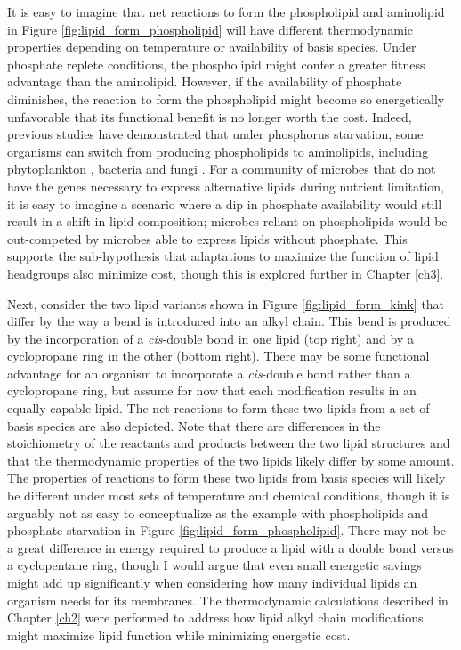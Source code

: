 It is easy to imagine that net reactions to form the phospholipid and aminolipid in Figure \ref{fig:lipid_form_phospholipid} will have different thermodynamic properties depending on temperature or availability of basis species. Under phosphate replete conditions, the phospholipid might confer a greater fitness advantage than the aminolipid. However, if the availability of phosphate diminishes, the reaction to form the phospholipid might become so energetically unfavorable that its functional benefit is no longer worth the cost. Indeed, previous studies have demonstrated that under phosphorus starvation, some organisms can switch from producing phospholipids to aminolipids, including phytoplankton \citep{van2009phytoplankton, martin2011phosphorus}, bacteria \citep{minnikin1974replacement, benning1995accumulation} and fungi \citep{riekhof2014phosphate}. For a community of microbes that do not have the genes necessary to express alternative lipids during nutrient limitation, it is easy to imagine a scenario where a dip in phosphate availability would still result in a shift in lipid composition; microbes reliant on phospholipids would be out-competed by microbes able to express lipids without phosphate. This supports the sub-hypothesis that adaptations to maximize the function of lipid headgroups also minimize cost, though this is explored further in Chapter \ref{ch3}.

Next, consider the two lipid variants shown in Figure \ref{fig:lipid_form_kink} that differ by the way a bend is introduced into an alkyl chain. This bend is produced by the incorporation of a \textit{cis}-double bond in one lipid (top right) and by a cyclopropane ring in the other (bottom right). There may be some functional advantage for an organism to incorporate a \textit{cis}-double bond rather than a cyclopropane ring, but assume for now that each modification results in an equally-capable lipid. The net reactions to form these two lipids from a set of basis species are also depicted. Note that there are differences in the stoichiometry of the reactants and products between the two lipid structures and that the thermodynamic properties of the two lipids likely differ by some amount. The properties of reactions to form these two lipids from basis species will likely be different under most sets of temperature and chemical conditions, though it is arguably not as easy to conceptualize as the example with phospholipids and phosphate starvation in Figure \ref{fig:lipid_form_phospholipid}. There may not be a great difference in energy required to produce a lipid with a double bond versus a cyclopentane ring, though I would argue that even small energetic savings might add up significantly when considering how many individual lipids an organism needs for its membranes. The thermodynamic calculations described in Chapter \ref{ch2} were performed to address how lipid alkyl chain modifications might maximize lipid function while minimizing energetic cost.

